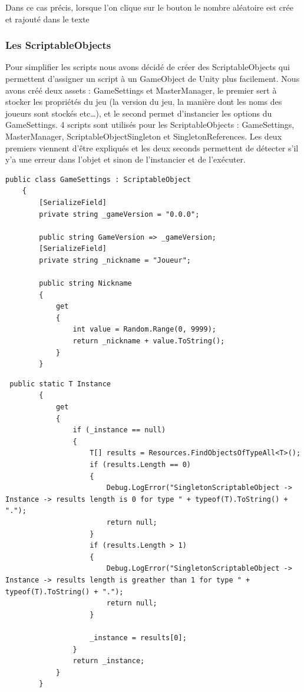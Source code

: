 \documentclass{article}
\begin{document}
Dans ce cas précis, lorsque l'on clique sur le bouton le nombre aléatoire est crée et rajouté dans le texte

\subsubsection{Les ScriptableObjects}

Pour simplifier les scripts nous avons décidé de créer des ScriptableObjects qui permettent d’assigner un script à un GameObject de Unity plus facilement. Nous avons créé deux assets : GameSettings et MasterManager, le premier sert à stocker les propriétés du jeu (la version du jeu, la manière dont les noms des joueurs sont stockés etc…), et le second permet d’instancier les options du GameSettings. 4 scripts sont utilisés pour les ScriptableObjects : GameSettings, MasterManager, ScriptableObjectSingleton et SingletonReferences. Les deux premiers viennent d’être expliqués et les deux seconds permettent de détecter s’il y’a une erreur dans l’objet et sinon de l'instancier et de l'exécuter.
\newpage
\begin{lstlisting}
public class GameSettings : ScriptableObject
    {
        [SerializeField]
        private string _gameVersion = "0.0.0";

        public string GameVersion => _gameVersion;
        [SerializeField]
        private string _nickname = "Joueur";

        public string Nickname
        {
            get
            {
                int value = Random.Range(0, 9999);
                return _nickname + value.ToString();
            }
        }
\end{lstlisting}

\begin{lstlisting}
 public static T Instance
        {
            get
            {
                if (_instance == null)
                {
                    T[] results = Resources.FindObjectsOfTypeAll<T>();
                    if (results.Length == 0)
                    {
                        Debug.LogError("SingletonScriptableObject -> Instance -> results length is 0 for type " + typeof(T).ToString() + ".");
                        return null;
                    }
                    if (results.Length > 1)
                    {
                        Debug.LogError("SingletonScriptableObject -> Instance -> results length is greather than 1 for type " + typeof(T).ToString() + ".");
                        return null;
                    }

                    _instance = results[0];
                }
                return _instance;
            }
        }
\end{lstlisting}
\end{document}
